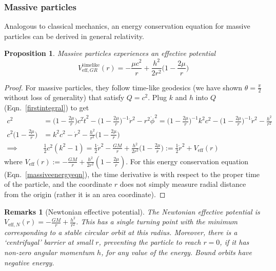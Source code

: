 \documentclass[a4paper]{article}
\newtheorem{remarks}{Remarks}[section]
\theoremstyle{new}
\newtheorem{prop}{Proposition}[section]
\begin{document}
\subsubsection{Massive particles}
Analogous to classical mechanics, an energy conservation equation for massive particles can be derived in general relativity. 
\begin{prop}
Massive particles experiences an effective potential
\begin{equation}
V_{\text{eff},GR}^{\text{timelike}}(r)=-\frac{\mu c^2}{r}+\frac{h^2}{2r^2}\bigg(1-\frac{2\mu}{r}\bigg)\label{timelikeeff}
\end{equation}
\end{prop}
\begin{proof}
For massive particles, they follow time-like geodesics (we have shown $\theta=\frac{\pi}{2}$ without loss of generality) that satisfy $Q=c^2$. Plug $k$ and $h$ into $Q$ (Eqn.~\ref{firstintegral}) to get
\begin{align}
    c^2&=\bigg(1-\frac{2\mu}{r}\bigg)c^2\dot{t}^2-\bigg(1-\frac{2\mu}{r}\bigg)^{-1}\dot{r}^2-r^2\dot{\phi}^2=\bigg(1-\frac{2\mu}{r}\bigg)^{-1}k^2c^2-\bigg(1-\frac{2\mu}{r}\bigg)^{-1}\dot{r}^2-\frac{h^2}{r^2}\nonumber\\c^2\bigg(1-\frac{2\mu}{r}\bigg)&=k^2c^2-\dot{r}^2-\frac{h^2}{r^2}\bigg(1-\frac{2\mu}{r}\bigg)\nonumber\\\implies&\frac{1}{2}c^2(k^2-1)=\frac{1}{2}\dot{r}^2-\frac{GM}{r}+\frac{h^2}{2r^2}\bigg(1-\frac{2\mu}{r}\bigg):=\frac{1}{2}\dot{r}^2+V_{\text{eff}}(r)\label{massiveenergyeqn}
\end{align}
where $V_{\text{eff}}(r):=-\frac{GM}{r}+\frac{h^2}{2r^2}(1-\frac{2\mu}{r})$. For this energy conservation equation (Eqn.~\ref{massiveenergyeqn}), the time derivative is with respect to the proper time of the particle, and the coordinate $r$ does not simply measure radial distance from the origin (rather it is an area coordinate).
\end{proof}
\begin{remarks}[Newtonian effective potential]
The Newtonian effective potential is $V_{\text{eff},N}(r)=-\frac{GM}{r}+\frac{h^2}{r^2}$. This has a single turning point with the minimum corresponding to a stable circular orbit at this radius. Moreover, there is a `centrifugal' barrier at small $r$, preventing the particle to reach $r=0$, if it has non-zero angular momentum $h$, for any value of the energy. Bound orbits have negative energy.
\end{remarks}
\begin{center}
\end{center}
\end{document}
